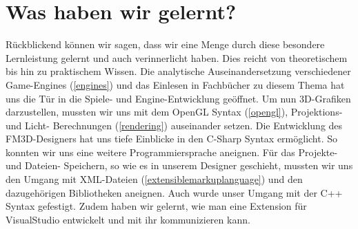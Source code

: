 \section{Was haben wir gelernt?}
Rückblickend können wir sagen, dass wir eine Menge durch diese besondere Lernleistung gelernt und auch verinnerlicht haben. Dies reicht von theoretischem bis hin zu praktischem Wissen. 
Die analytische Auseinandersetzung verschiedener Game-Engines (\cref{engines}) und das Einlesen in Fachbücher zu diesem Thema hat uns die Tür in die Spiele- und Engine-Entwicklung geöffnet. Um nun 3D-Grafiken darzustellen, mussten wir uns mit dem OpenGL Syntax (\cref{opengl}), Projektions- und Licht- Berechnungen (\cref{rendering}) auseinander setzen.
Die Entwicklung des FM3D-Designers hat uns tiefe Einblicke in den C-Sharp Syntax ermöglicht. So konnten wir uns eine weitere Programmiersprache aneignen. Für das Projekte- und Dateien- Speichern, so wie es in unserem Designer geschieht, mussten wir uns den Umgang mit XML-Dateien (\cref{extensiblemarkuplanguage}) und den dazugehörigen Bibliotheken aneignen. Auch wurde unser Umgang mit der C++ Syntax gefestigt. Zudem haben wir gelernt, wie man eine Extension für VisualStudio entwickelt und mit ihr kommunizieren kann.
